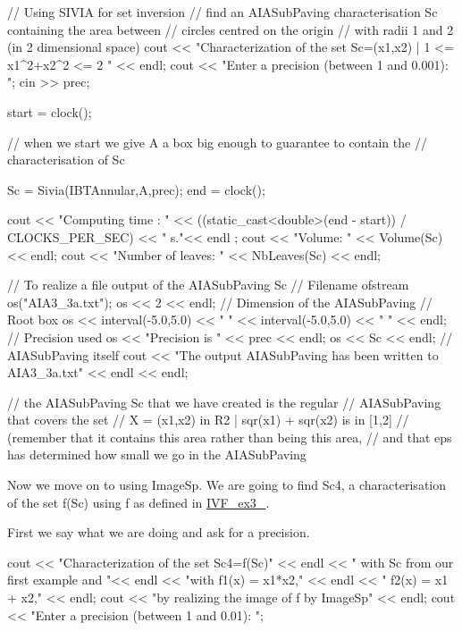 \begin{DoxyCodeInclude}
  // Using SIVIA for set inversion
  // find an AIASubPaving characterisation Sc containing the area between 
  // circles centred on the origin
  // with radii 1 and 2 (in 2 dimensional space)
  cout << "Characterization of the set Sc={(x1,x2) | 1 <= x1^2+x2^2 <= 2 }" 
       << endl;
  cout << "Enter a precision (between 1 and 0.001): ";
  cin >> prec;

  start = clock();

  // when we start we give A a box big enough to guarantee to contain the 
  // characterisation of Sc

  Sc = Sivia(IBTAnnular,A,prec);
  end = clock();

  cout << "Computing time : " 
       << ((static_cast<double>(end - start)) / CLOCKS_PER_SEC) << " s."<< endl
      ;
  cout << "Volume: " << Volume(Sc) << endl;
  cout << "Number of leaves: " << NbLeaves(Sc) << endl;

  // To realize a file output of the AIASubPaving Sc
                    // Filename
  ofstream os("AIA3_3a.txt");
  os << 2 << endl;  // Dimension of the AIASubPaving
                    // Root box
  os << interval(-5.0,5.0) << " "
    << interval(-5.0,5.0) << " " << endl;
                    // Precision used
  os << "Precision is " << prec << endl;
  os << Sc << endl; // AIASubPaving itself
  cout << "The output AIASubPaving has been written to AIA3_3a.txt" 
       << endl << endl;

  // the AIASubPaving Sc that we have created is the regular 
  // AIASubPaving that covers the set
  // X = {(x1,x2) in R2 | sqr(x1) + sqr(x2) is in [1,2]} 
  // (remember that it contains this area rather than being this area, 
  // and that eps has determined how small we go in the AIASubPaving 

\end{DoxyCodeInclude}


\-Now we move on to using \-Image\-Sp. \-We are going to find \-Sc4, a characterisation of the set f(\-Sc) using f as defined in \hyperlink{Exm__3__3_8cpp_a08a7ccec803f0858fe9d44dbeb8e9a29}{\-I\-V\-F\-\_\-ex3\-\_}.

\-First we say what we are doing and ask for a precision.


\begin{DoxyCodeInclude}
  cout << "Characterization of the set Sc4=f(Sc)" << endl
    << " with Sc from our first example and "<< endl
    << "with f1(x) = x1*x2," << endl
    << "     f2(x) = x1 + x2," << endl;
  cout << "by realizing the image of f by ImageSp" << endl;
  cout << "Enter a precision (between 1 and 0.01): ";

\end{DoxyCodeInclude}


